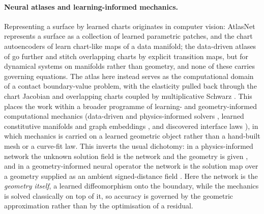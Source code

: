 \documentclass{svjour3}                 %
\begin{document}
\paragraph{Neural atlases and learning-informed mechanics.}
Representing a surface by learned charts originates in computer vision: AtlasNet
\citep{groueix2018atlasnet} represents a surface as a collection of learned parametric patches, and the chart
autoencoders of \citet{schonsheck2019chart} learn chart-like maps of a data manifold; the data-driven atlases
of \citet{floryan2022charts} go further and stitch overlapping charts by explicit transition maps, but for
dynamical systems on manifolds rather than geometry, and none of these carries governing equations. The atlas
here instead serves as the computational domain of a contact boundary-value problem, with the
elasticity pulled back through the chart Jacobian and overlapping charts coupled by multiplicative Schwarz
\citep{sun2026neuralatlas}. This places the work within a broader programme of learning- and geometry-informed
computational mechanics (data-driven and physics-informed solvers \citep{kirchdoerfer2016datadriven,raissi2019pinn},
learned constitutive manifolds and graph embeddings \citep{wang2018multiscale,vlassis2020geometric,
xiao2022geometric,bahmani2022manifold,heider2020so3}, and discovered interface laws
\citep{wang2019metamodeling}), in which mechanics is carried on a learned geometric object rather than a
hand-built mesh or a curve-fit law. This inverts the usual dichotomy: in a physics-informed network the unknown
solution field is the network and the geometry is given \citep{raissi2019pinn}, and in a geometry-informed
neural operator the network is the solution map over a geometry supplied as an ambient signed-distance field
\citep{li2023gino}. Here the network is the \emph{geometry itself}, a learned diffeomorphism onto the
boundary, while the mechanics is solved classically on top of it, so accuracy is governed by the geometric
approximation rather than by the optimisation of a residual.
\end{document}
